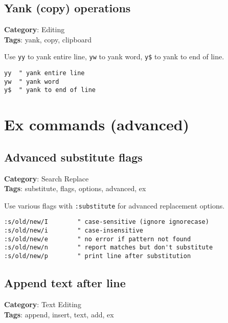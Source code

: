 {{{{{\section{Yank (copy) operations}

\textbf{Category}: Editing\\ \textbf{Tags}: yank, copy, clipboard
\vspace{0.5cm}

Use {\footnotesize \Verb§yy§} to yank entire line, {\footnotesize \Verb§yw§} to yank word, {\footnotesize \Verb§y$§} to yank to end of line.

\begin{Exa*}{}
\begin{Verbatim}[fontsize=\footnotesize, breaklines, breakanywhere]
yy  " yank entire line
yw  " yank word
y$  " yank to end of line
\end{Verbatim}
\end{Exa*}

\chapter{Ex commands (advanced)}
\section{Advanced substitute flags}

\textbf{Category}: Search Replace\\ \textbf{Tags}: substitute, flags, options, advanced, ex
\vspace{0.5cm}

Use various flags with {\footnotesize \Verb§:substitute§} for advanced replacement options.

\begin{Exa*}{}
\begin{Verbatim}[fontsize=\footnotesize, breaklines, breakanywhere]
:s/old/new/I        " case-sensitive (ignore ignorecase)
:s/old/new/i        " case-insensitive
:s/old/new/e        " no error if pattern not found
:s/old/new/n        " report matches but don't substitute
:s/old/new/p        " print line after substitution
\end{Verbatim}
\end{Exa*}

\section{Append text after line}

\textbf{Category}: Text Editing\\ \textbf{Tags}: append, insert, text, add, ex
\vspace{0.5cm}

}}}}}
